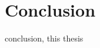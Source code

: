 \chapter{Conclusion}
\renewcommand{\baselinestretch}{\mystretch}
\label{chap:Con}
 conclusion, this thesis